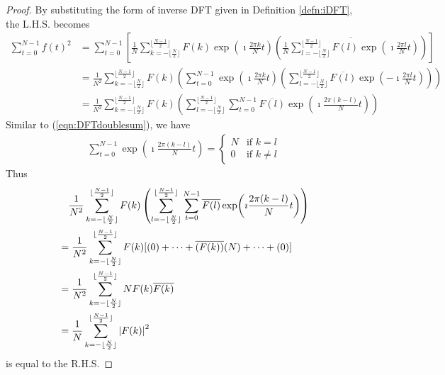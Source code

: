\begin{proof}
By substituting the form of inverse DFT given in Definition \ref{defn:iDFT}, the L.H.S. becomes 
\begin{align*}
\sum_{t=0}^{N-1} f(t)^2 &= \sum_{t=0}^{N-1} \left[ \frac{1}{N} \sum_{k= -\lfloor \frac{N}{2} \rfloor}^{\lfloor \frac{N-1}{2} \rfloor} F(k)\exp(\imath\frac{2\pi k}{N}t) \left( \overline{ \frac{1}{N}\sum_{l= -\lfloor \frac{N}{2} \rfloor}^{\lfloor \frac{N-1}{2} \rfloor} F(l)\exp(\imath\frac{2\pi l}{N}t)} \right) \right] \\
&= \frac{1}{N^2} \sum_{k= -\lfloor \frac{N}{2} \rfloor}^{\lfloor \frac{N-1}{2} \rfloor} F(k) \left(\sum_{t=0}^{N-1} \exp(\imath\frac{2\pi k}{N}t) \left( \sum_{l= -\lfloor \frac{N}{2} \rfloor}^{\lfloor \frac{N-1}{2} \rfloor} \overline{F(l)}\exp(-\imath\frac{2\pi l}{N}t) \right) \right) \\
&= \frac{1}{N^2} \sum_{k= -\lfloor \frac{N}{2} \rfloor}^{\lfloor \frac{N-1}{2} \rfloor} F(k) \left( \sum_{l= -\lfloor \frac{N}{2} \rfloor}^{\lfloor \frac{N-1}{2} \rfloor}  \sum_{t=0}^{N-1} \overline{F(l)}\exp(\imath\frac{2\pi (k-l)}{N}t) \right) 
\end{align*}
Similar to (\ref{eqn:DFTdoublesum}), we have
\begin{align*}
\sum_{t=0}^{N-1} \exp(\imath\frac{2\pi (k-l)}{N}t)  = 
\begin{cases}
N & \text{if $k = l$} \\
0 & \text{if $k \neq l$}
\end{cases}     
\end{align*}
Thus
\begin{align*}
&\quad \frac{1}{N^2} \sum_{k= -\lfloor \frac{N}{2} \rfloor}^{\lfloor \frac{N-1}{2} \rfloor} F(k) \left( \sum_{l= -\lfloor \frac{N}{2} \rfloor}^{\lfloor \frac{N-1}{2} \rfloor}  \sum_{t=0}^{N-1} \overline{F(l)}\exp(\imath\frac{2\pi (k-l)}{N}t) \right) \\
&= \frac{1}{N^2} \sum_{k= -\lfloor \frac{N}{2} \rfloor}^{\lfloor \frac{N-1}{2} \rfloor} F(k) [(0) + \cdots + \overline{(F(k))}(N) + \cdots + (0)] \\
&= \frac{1}{N^2} \sum_{k= -\lfloor \frac{N}{2} \rfloor}^{\lfloor \frac{N-1}{2} \rfloor} N F(k)\overline{F(k)} \\
&= \frac{1}{N} \sum_{k= -\lfloor \frac{N}{2} \rfloor}^{\lfloor \frac{N-1}{2} \rfloor} \abs{F(k)}^2
\end{align*} 
is equal to the R.H.S.
\end{proof}

